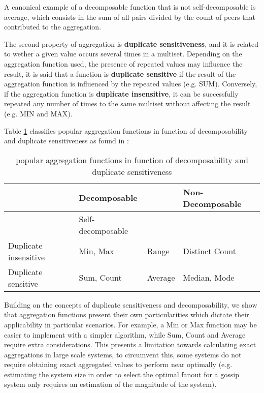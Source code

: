 A canonical example of a decomposable function that is not self-decomposable is average, which consists in the sum of all pairs divided by the count of peers that contributed to the aggregation.

The second property of aggregation is \textbf{duplicate sensitiveness}, and it is related to wether a given value occurs several times in a multiset. Depending on the aggregation function used, the presence of repeated values may influence the result, it is said that a function is \textbf{duplicate sensitive} if the result of the aggregation function is influenced by the repeated values (e.g. SUM). Conversely, if the aggregation function is \textbf{duplicate insensitive}, it can be successfully repeated any number of times to the same multiset without affecting the result (e.g. MIN and MAX).

Table \ref{table:aggregation_functions} classifies popular aggregation functions in function of decomposability and duplicate sensitiveness as found in \cite{DBLP:journals/corr/abs-1110-0725}:

\begin{table}[]
    \begin{tabular}{|l|l|l|l|}
    \hline
                          & \multicolumn{2}{l|}{Decomposable} & Non-Decomposable  \\ \hline
                          & Self-decomposable    &                             &  \\ \hline
    Duplicate insensitive & Min, Max             & Range     & Distinct Count    \\ \hline
    Duplicate sensitive   & Sum, Count           & Average   & Median, Mode     \\ \hline
    \end{tabular}
    \caption{popular aggregation functions in function of decomposability and duplicate sensitiveness}
    \label{table:aggregation_functions}
\end{table}

Building on the concepts of duplicate sensitiveness and decomposability, we show that aggregation functions present their own particularities which dictate their applicability in particular scenarios. For example, a Min or Max function may be easier to implement with a simpler algorithm, while Sum, Count and Average require extra considerations. This presents a limitation towards calculating exact aggregations in large scale systems, to circumvent this, some systems do not require obtaining exact aggregated values to perform near optimally  (e.g. estimating the system size in order to select the optimal fanout for a gossip system only requires an estimation of the magnitude of the system). 

